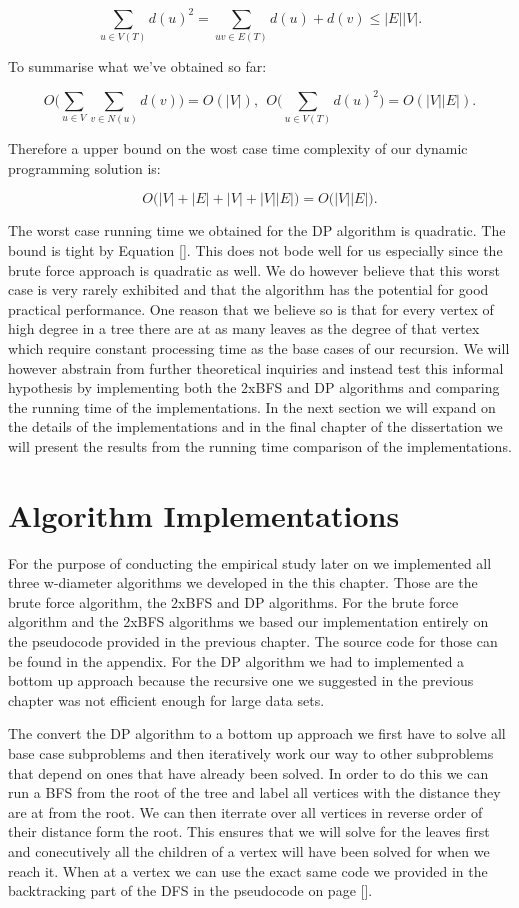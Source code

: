 $$ \sum_{u \in V(T)}{d(u)^2} = \sum_{uv \in E(T)}{d(u) + d(v)} \le |E||V| .$$

To summarise what we've obtained so far:

$$ O\bigg( \sum_{u \in V}{\sum_{v \in N(u)}{d(v)}} \bigg) = O(|V|)  , ~~ O\bigg( \sum_{u \in V(T)}{d(u)^2} \bigg) = O(|V||E|).$$

Therefore a upper bound on the wost case time complexity of our dynamic programming solution is:

$$ O\big( |V| + |E| + |V| + |V||E|  \big) = O\big(|V||E|\big).$$

The worst case running time we obtained for the DP algorithm is quadratic. The bound is tight by Equation []. This does not bode well for us especially since the brute force approach is quadratic as well. We do however believe that this worst case is very rarely exhibited and that the algorithm has the potential for good practical performance. One reason that we believe so is that for every vertex of high degree in a tree there are at as many leaves as the degree of that vertex which require constant processing time as the base cases of our recursion. We will however abstrain from further theoretical inquiries and instead test this informal hypothesis by implementing both the 2xBFS and DP algorithms and comparing the running time of the implementations. In the next section we will expand on the details of the implementations and in the final chapter of the dissertation we will present the results from the running time comparison of the implementations.


\section{Algorithm Implementations}

For the purpose of conducting the empirical study later on we implemented all three w-diameter algorithms we developed in the this chapter. Those are the brute force algorithm, the 2xBFS and DP algorithms.  For the brute force algorithm and the 2xBFS algorithms we based our implementation entirely on the pseudocode provided in the previous chapter. The source code for those can be found in the appendix. For the DP algorithm we had to implemented a bottom up approach because the recursive one we suggested in the previous chapter was not efficient enough for large data sets.

The convert the DP algorithm to a bottom up approach we first have to solve all base case subproblems and then iteratively work our way to other subproblems that depend on ones that have already been solved. In order to do this we can run a BFS from the root of the tree and label all vertices with the distance they are at from the root. We can then iterrate over all vertices in reverse order of their distance form the root. This ensures that we will solve for the leaves first and conecutively all the children of a vertex will have been solved for when we reach it. When at a vertex we can use the exact same code we provided in the backtracking part of the DFS in the pseudocode on page [].

